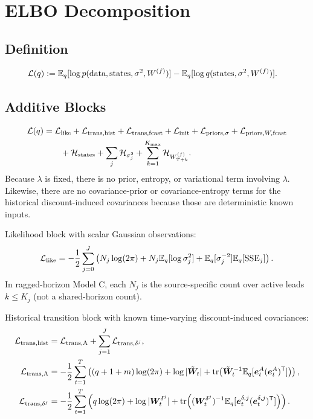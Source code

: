 \section{ELBO Decomposition}

\subsection{Definition}
\begin{align}
\mathcal{L}(q)
&:= \mathbb{E}_q[\log p(\text{data},\text{states},\sigma^2,W^{(f)})]
-\mathbb{E}_q[\log q(\text{states},\sigma^2,W^{(f)})].
\label{eq:elbo_def}
\end{align}

\subsection{Additive Blocks}
\begin{align}
\mathcal{L}(q)
&= \mathcal{L}_{\text{like}}
+\mathcal{L}_{\text{trans,hist}}
+\mathcal{L}_{\text{trans,fcast}}
+\mathcal{L}_{\text{init}}
+\mathcal{L}_{\text{priors},\sigma}
+\mathcal{L}_{\text{priors},W,\mathrm{fcast}} \nonumber\\
&\qquad
+\mathcal{H}_{\text{states}}
+\sum_j\mathcal{H}_{\sigma_j^2}
+\sum_{k=1}^{K_{\max}}\mathcal{H}_{W_{T+k}^{(f)}}.
\label{eq:elbo_blocks}
\end{align}
Because $\lambda$ is fixed, there is no prior, entropy, or variational term involving $\lambda$.
Likewise, there are no covariance-prior or covariance-entropy terms for the historical
discount-induced covariances because those are deterministic known inputs.

Likelihood block with scalar Gaussian observations:
\begin{align}
\mathcal{L}_{\text{like}}
= -\frac12\sum_{j=0}^{J}\left(
N_j\log(2\pi)
+N_j\mathbb{E}_q[\log \sigma_j^2]
+\mathbb{E}_q[\sigma_j^{-2}]\mathbb{E}_q[\mathrm{SSE}_j]
\right).
\label{eq:elbo_like}
\end{align}
In ragged-horizon Model C, each $N_j$ is the source-specific count over active leads
$k\le K_j$ (not a shared-horizon count).

Historical transition block with known time-varying discount-induced covariances:
\begin{align}
\mathcal{L}_{\text{trans,hist}}
&= \mathcal{L}_{\text{trans,A}} + \sum_{j=1}^{J}\mathcal{L}_{\text{trans},\delta^j},
\label{eq:elbo_trans_hist}\\
\mathcal{L}_{\text{trans,A}}
&= -\frac12\sum_{t=1}^{T}\left(
(q+1+m)\log(2\pi)
+\log|\tilde{\bm W}_t|
+\mathrm{tr}\!\left(\tilde{\bm W}_t^{-1}\mathbb{E}_q[\bm e_t^A(\bm e_t^A)^{\mathsf{T}}]\right)
\right),
\label{eq:elbo_trans_hist_A}\\
\mathcal{L}_{\text{trans},\delta^j}
&= -\frac12\sum_{t=1}^{T}\left(
q\log(2\pi)
+\log|\bm W_t^{\delta^j}|
+\mathrm{tr}\!\left((\bm W_t^{\delta^j})^{-1}\mathbb{E}_q[\bm e_t^{\delta,j}(\bm e_t^{\delta,j})^{\mathsf{T}}]\right)
\right).
\label{eq:elbo_trans_hist_delta}
\end{align}

